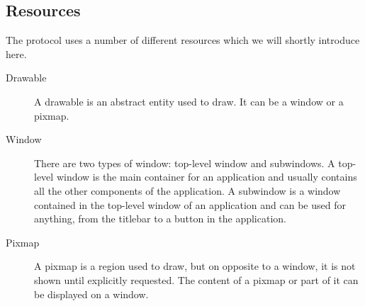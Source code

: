 \subsection{Resources}
The protocol uses a number of different resources which we will shortly 
introduce here.
\begin{description}
\item[Drawable] A drawable is an abstract entity used to draw. It can be a window or a pixmap.
\item[Window] There are two types of window: top-level window and subwindows. 
  A top-level window is the main container for an application and 
  usually contains all the other components of the application.
  A subwindow is a window contained in the top-level window of an application 
  and can be used for anything, from the titlebar to a button in the application.
\item[Pixmap] A pixmap is a region used to draw, but on opposite to a window, 
  it is not shown until explicitly requested. The content of a pixmap 
  or part of it can be displayed on a window.

\end{description}

